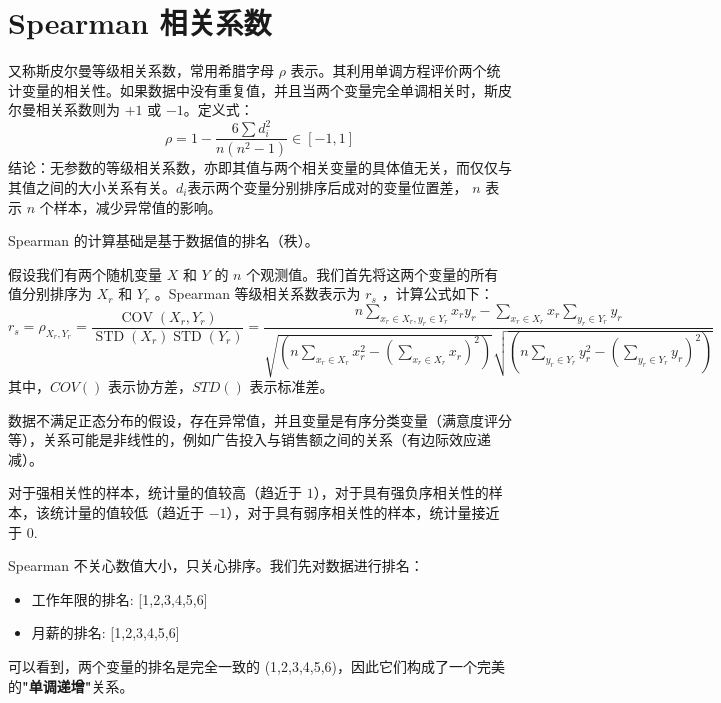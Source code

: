 \section{Spearman 相关系数}

\begin{definition}
    又称斯皮尔曼等级相关系数，常用希腊字母 $\rho$ 表示。其利用单调方程评价两个统计变量的相关性。如果数据中没有重复值，并且当两个变量完全单调相关时，斯皮尔曼相关系数则为 $+1$ 或 $-1$。定义式：
    $$
        \rho=1-\frac{6 \sum d_i^2}{n\left(n^2-1\right)} \in [-1, 1]
    $$
    结论：无参数的等级相关系数，亦即其值与两个相关变量的具体值无关，而仅仅与其值之间的大小关系有关。$d_i$表示两个变量分别排序后成对的变量位置差， $n$ 表示 $n$ 个样本，减少异常值的影响。
\end{definition}

Spearman 的计算基础是基于数据值的排名（秩）。

\begin{theorem}
    假设我们有两个随机变量 $X$ 和 $Y$ 的 $n$ 个观测值。我们首先将这两个变量的所有值分别排序为 $X_r$ 和 $Y_r$ 。Spearman 等级相关系数表示为 $r_s$ ，计算公式如下：
    $$
        r_s=\rho_{X_r, Y_r}=\frac{\operatorname{COV}\left(X_r, Y_r\right)}{\operatorname{STD}\left(X_r\right) \operatorname{STD}\left(Y_r\right)}=\frac{n \sum_{x_r \in X_r, y_r \in Y_r} x_r y_r-\sum_{x_r \in X_r} x_r \sum_{y_r \in Y_r} y_r}{\sqrt{\left(n \sum_{x_r \in X_r} x_r^2-\left(\sum_{x_r \in X_r} x_r\right)^2\right)} \sqrt{\left(n \sum_{y_r \in Y_r} y_r^2-\left(\sum_{y_r \in Y_r} y_r\right)^2\right)}}
    $$
    其中，$COV()$ 表示协方差，$STD()$ 表示标准差。
\end{theorem}

\begin{tips}
    数据不满足正态分布的假设，存在异常值，并且变量是有序分类变量（满意度评分等），关系可能是非线性的，例如广告投入与销售额之间的关系（有边际效应递减）。
\end{tips}

\begin{corollary}[判别]
    对于强相关性的样本，统计量的值较高（趋近于 $1$），对于具有强负序相关性的样本，该统计量的值较低（趋近于 $-1$），对于具有弱序相关性的样本，统计量接近于 $0$.
\end{corollary}

\begin{warning}
    Spearman 不关心数值大小，只关心排序。我们先对数据进行排名：
    \begin{itemize}
        \item 工作年限的排名: [1,2,3,4,5,6]
        \item 月薪的排名: [1,2,3,4,5,6]
    \end{itemize}
    可以看到，两个变量的排名是完全一致的 (1,2,3,4,5,6)，因此它们构成了一个完美的\textbf{"单调递增"}关系。
\end{warning}

